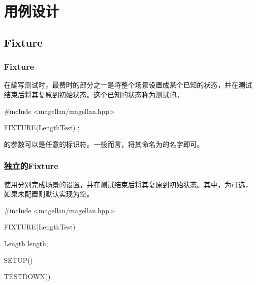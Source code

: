 \begin{savequote}[45mm]
\end{savequote}

\chapter{用例设计} 
\label{ch:test-case}

\section{Fixture}

\begin{content}

\subsection{Fixture}

在编写测试时，最费时的部分之一是将整个场景设置成某个已知的状态，并在测试结束后将其复原到初始状态。这个已知的状态称为测试的。 

\begin{leftbar}
\begin{c++}[caption={test/quantity/LengthTest.cpp}]
#include <magellan/magellan.hpp>

FIXTURE(LengthTest)
{
};
\end{c++}
\end{leftbar}

的参数可以是任意的标识符。一般而言，将其命名为的名字即可。

\subsection{独立的Fixture}

使用分别完成场景的设置，并在测试结束后将其复原到初始状态。其中，为可选，如果未配置则默认实现为空。

\begin{leftbar}
\begin{c++}[caption={test/quantity/LengthTest.cpp}]
#include <magellan/magellan.hpp>

FIXTURE(LengthTest)
{
    Length length;

    SETUP()
    {}

    TESTDOWN()
    {}

}
\end{c++}
\end{leftbar}
\end{content}
